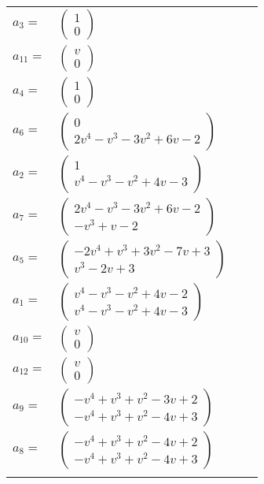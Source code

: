 \documentclass[1p]{elsarticle_modified}
\theoremstyle{definition}
\begin{document}
\begin{tabular}{m{7pt} m{180pt} m{7pt} m{180pt} }
\flushright $a_{3}=$&$\begin{pmatrix}1\\0\end{pmatrix}$ \\
\flushright $a_{11}=$&$\begin{pmatrix}v\\0\end{pmatrix}$ \\
\flushright $a_{4}=$&$\begin{pmatrix}1\\0\end{pmatrix}$ \\
\flushright $a_{6}=$&$\begin{pmatrix}0\\2 v^4- v^3-3 v^2+6 v-2\end{pmatrix}$ \\
\flushright $a_{2}=$&$\begin{pmatrix}1\\v^4- v^3- v^2+4 v-3\end{pmatrix}$ \\
\flushright $a_{7}=$&$\begin{pmatrix}2 v^4- v^3-3 v^2+6 v-2\\- v^3+v-2\end{pmatrix}$ \\
\flushright $a_{5}=$&$\begin{pmatrix}-2 v^4+v^3+3 v^2-7 v+3\\v^3-2 v+3\end{pmatrix}$ \\
\flushright $a_{1}=$&$\begin{pmatrix}v^4- v^3- v^2+4 v-2\\v^4- v^3- v^2+4 v-3\end{pmatrix}$ \\
\flushright $a_{10}=$&$\begin{pmatrix}v\\0\end{pmatrix}$ \\
\flushright $a_{12}=$&$\begin{pmatrix}v\\0\end{pmatrix}$ \\
\flushright $a_{9}=$&$\begin{pmatrix}- v^4+v^3+v^2-3 v+2\\- v^4+v^3+v^2-4 v+3\end{pmatrix}$ \\
\flushright $a_{8}=$&$\begin{pmatrix}- v^4+v^3+v^2-4 v+2\\- v^4+v^3+v^2-4 v+3\end{pmatrix}$\\&\end{tabular}
\end{document}
